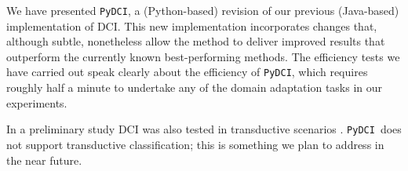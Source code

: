 \documentclass{article}
\newcommand{\pydci}{\texttt{PyDCI}}
\begin{document}
\noindent We have presented \pydci, a (Python-based) revision of our
previous (Java-based) implementation of DCI.  This new implementation
incorporates changes that, although subtle, nonetheless allow the
method to deliver improved results that outperform the currently known
best-performing methods.  The efficiency tests we have carried out
speak clearly about the efficiency of \pydci, which requires roughly
half a minute to undertake any of the domain adaptation tasks in our
experiments.

In a preliminary study DCI was also tested in transductive scenarios
\citep{Moreo:2016pa}.  \pydci\ does not support transductive
classification; this is something we plan to address in the near
future.



%
%
% 

\end{document}
